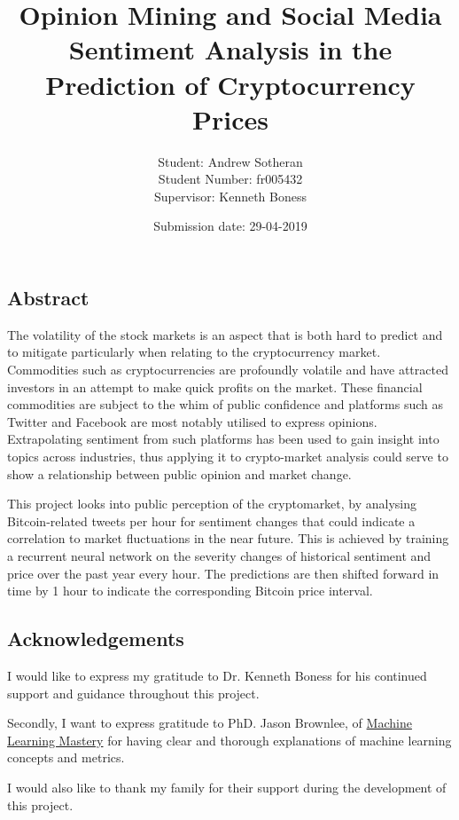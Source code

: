 \documentclass[oneside, 12pt]{article}
\title{Opinion Mining and Social Media Sentiment Analysis in the Prediction of Cryptocurrency Prices}
\date{Submission date: 29-04-2019}
\author{Student: Andrew Sotheran
	\\Student Number: fr005432
	\\Supervisor: Kenneth Boness}
\begin{document}
	
	\maketitle
	
	\vspace*{\fill}
	\begin{center}
		\section{Abstract}\label{abstract}
	\end{center}
		The volatility of the stock markets is an aspect that is both hard to predict and to mitigate particularly when relating to the cryptocurrency market. Commodities such as cryptocurrencies are profoundly volatile and have attracted investors in an attempt to make quick profits on the market. These financial commodities are subject to the whim of public confidence and platforms such as Twitter and Facebook are most notably utilised to express opinions. Extrapolating sentiment from such platforms has been used to gain insight into topics across industries, thus applying it to crypto-market analysis could serve to show a relationship between public opinion and market change. 
		
		This project looks into public perception of the cryptomarket, by analysing Bitcoin-related tweets per hour for sentiment changes that could indicate a correlation to market fluctuations in the near future. This is achieved by training a recurrent neural network on the severity changes of historical sentiment and price over the past year every hour. The predictions are then shifted forward in time by 1 hour to indicate the corresponding Bitcoin price interval.

	
	\newpage
	\begin{center}
		\section{Acknowledgements}\label{acknowledgements}
		I would like to express my gratitude to Dr. Kenneth Boness for his continued support and guidance throughout this project.  
		
		Secondly, I want to express gratitude to PhD. Jason Brownlee, of \href{machinelearningmastery.com}{Machine Learning Mastery} for having clear and thorough explanations of machine learning concepts and metrics.
		
		I would also like to thank my family for their support during the development of this project.
		
	\end{center}
	
\end{document}
